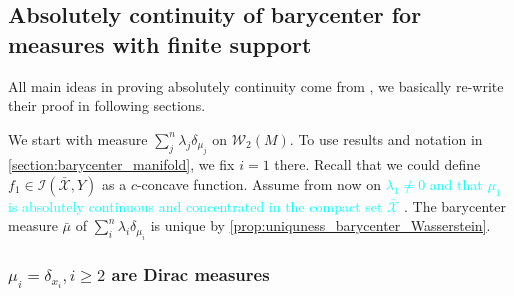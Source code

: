 \subsection{Absolutely continuity of barycenter for measures with finite support}

All main ideas in proving absolutely continuity come from \cite{KIM2017640},
we basically re-write their proof in following sections.

We start with measure
$\sum_{j}^{n} \lambda_{j} \delta_{\mu_j}$ on $\mathcal{W}_{2}(M)$.
To use results and notation in \cref{section:barycenter_manifold},
we fix $i = 1$ there.
Recall that we could define $f_1 \in \mathcal{I}( \bar{ \mathcal{X} }, Y)$
as a $c$-concave function.
Assume from now on \textcolor{cyan}{
	$ \lambda_1 \neq 0$ and that $\mu_1$ is absolutely continuous and
	concentrated in the compact set $\bar{ \mathcal{X} }$
}.
The barycenter measure $\bar{\mu}$ of $\sum_{i}^{n} \lambda_{i} \delta_{\mu_i}$ is unique by \cref{prop:uniquness_barycenter_Wasserstein}.

\subsubsection{$\mu_i = \delta_{x_i}, i \geq 2$ are Dirac measures}

